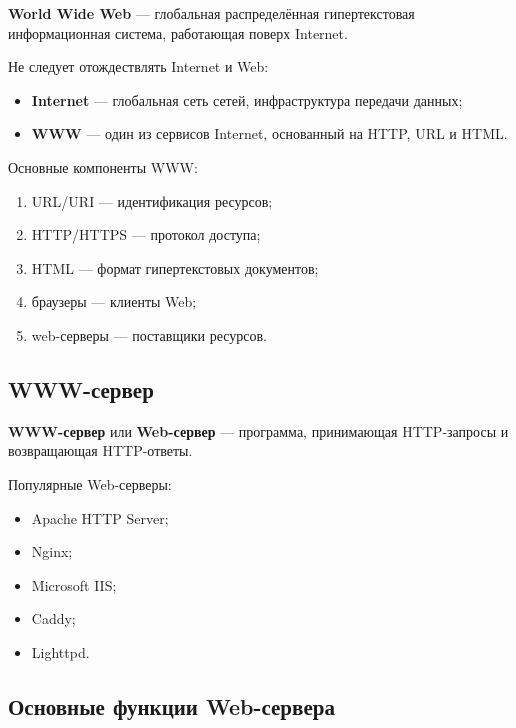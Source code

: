 \documentclass[12pt,a4paper]{article}
\begin{document}
\textbf{World Wide Web} --- глобальная распределённая гипертекстовая информационная система, работающая поверх Internet.

Не следует отождествлять Internet и Web:
\begin{itemize}
    \item \textbf{Internet} --- глобальная сеть сетей, инфраструктура передачи данных;
    \item \textbf{WWW} --- один из сервисов Internet, основанный на HTTP, URL и HTML.
\end{itemize}

Основные компоненты WWW:
\begin{enumerate}
    \item URL/URI --- идентификация ресурсов;
    \item HTTP/HTTPS --- протокол доступа;
    \item HTML --- формат гипертекстовых документов;
    \item браузеры --- клиенты Web;
    \item web-серверы --- поставщики ресурсов.
\end{enumerate}

\subsection{WWW-сервер}

\textbf{WWW-сервер} или \textbf{Web-сервер} --- программа, принимающая HTTP-запросы и возвращающая HTTP-ответы.

Популярные Web-серверы:
\begin{itemize}
    \item Apache HTTP Server;
    \item Nginx;
    \item Microsoft IIS;
    \item Caddy;
    \item Lighttpd.
\end{itemize}

\subsection{Основные функции Web-сервера}
\end{document}
